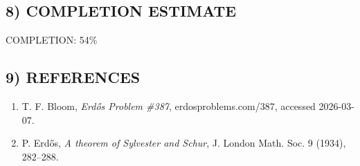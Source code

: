 \subsection*{8) COMPLETION ESTIMATE}
COMPLETION: 54\%

\subsection*{9) REFERENCES}
\begin{enumerate}
\item T. F. Bloom, \emph{Erd\H{o}s Problem \#387}, erdosproblems.com/387, accessed 2026-03-07.
\item P. Erd\H{o}s, \emph{A theorem of Sylvester and Schur}, J. London Math. Soc. 9 (1934), 282--288.
\end{enumerate}
